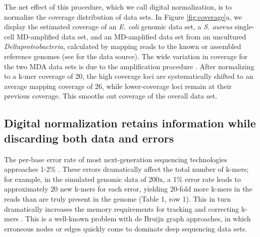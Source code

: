 \documentclass{pnastwo}
\begin{document}
\begin{article}
The net effect of this procedure, which we call digital normalization,
is to normalize the coverage distribution of data sets.  In Figure
\ref{fig:coverage}a, we display the estimated coverage of an {\em
  E. coli} genomic data set, a {\em S. aureus} single-cell
MD-amplified data set, and an MD-amplified data set from an uncultured
{\em Deltaproteobacteria}, calculated by mapping reads to the known or
assembled reference genomes (see \cite{pubmed21926975} for the data
source).  The wide variation in coverage for the two MDA data sets is
due to the amplification procedure \cite{pubmed17487184}.  After
normalizing to a k-mer coverage of 20, the high coverage loci are
systematically shifted to an average mapping coverage of 26, while
lower-coverage loci remain at their previous coverage.  This smooths
out coverage of the overall data set.


\subsection{Digital normalization retains information while discarding
both data and errors}

The per-base error rate of most next-generation sequencing
technologies approaches 1-2\% \cite{pubmed19997069}.  These errors
dramatically affect the total number of k-mers; for example, in the
simulated genomic data of 200x, a 1\% error rate leads to
approximately 20 new k-mers for each error, yielding 20-fold more
k-mers in the reads than are truly present in the genome (Table 1, row
1).  This in turn dramatically increases the memory requirements for
tracking and correcting k-mers \cite{pubmed21245053}.  This is a
well-known problem with de Bruijn graph approaches, in which erroneous
nodes or edges quickly come to dominate deep sequencing data sets.


\end{article}
\end{document}
